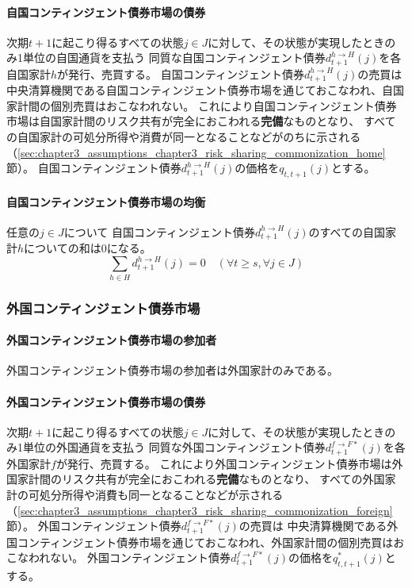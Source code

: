 \paragraph{自国コンティンジェント債券市場の債券}
\label{sec:chapter3_assumptions_bond_markets_home_bonds}
次期\(t+1\)に起こり得るすべての状態\(j\in J\)に対して、その状態が実現したときのみ1単位の自国通貨を支払う
同質な自国コンティンジェント債券\(d_{t+1}^{h\to H}(j)\)を各自国家計\(h\)が発行、売買する。
自国コンティンジェント債券\(d_{t+1}^{h\to H}(j)\)の売買は
中央清算機関である自国コンティンジェント債券市場を通じておこなわれ、自国家計間の個別売買はおこなわれない。
これにより自国コンティンジェント債券市場は自国家計間のリスク共有が完全におこわれる\textbf{完備}なものとなり、
すべての自国家計の可処分所得や消費が同一となることなどがのちに示される
（\ref{sec:chapter3_assumptions_chapter3_risk_sharing_commonization_home}節）。
自国コンティンジェント債券\(d_{t+1}^{h\to H}(j)\)の価格を\(q_{t,t+1}(j)\)とする。

\paragraph{自国コンティンジェント債券市場の均衡}
\label{sec:chapter3_assumptions_bond_markets_home_equilibrium}
任意の\(j\in J\)について
自国コンティンジェント債券\(d_{t+1}^{h\to H}(j)\)のすべての自国家計\(h\)についての和は0になる。
\begin{equation}
\label{form:chapter3_assumptions_bond_markets_home_equilibrium}
    \sum_{h\in H}d_{t+1}^{h\to H}(j)=0 \quad (\forall t\ge s, \forall j\in J)
\end{equation}

\subsubsection{外国コンティンジェント債券市場}
\label{sec:chapter3_assumptions_bond_markets_foreign}

\paragraph{外国コンティンジェント債券市場の参加者}
\label{sec:chapter3_assumptions_bond_markets_foreign_participants}
外国コンティンジェント債券市場の参加者は外国家計のみである。

\paragraph{外国コンティンジェント債券市場の債券}
\label{sec:chapter3_assumptions_bond_markets_foreign_bonds}
次期\(t+1\)に起こり得るすべての状態\(j\in J\)に対して、その状態が実現したときのみ1単位の外国通貨を支払う
同質な外国コンティンジェント債券\(d_{t+1}^{f\to F*}(j)\)を各外国家計\(f\)が発行、売買する。
これにより外国コンティンジェント債券市場は外国家計間のリスク共有が完全におこわれる\textbf{完備}なものとなり、
すべての外国家計の可処分所得や消費も同一となることなどが示される
（\ref{sec:chapter3_assumptions_chapter3_risk_sharing_commonization_foreign}節）。
外国コンティンジェント債券\(d_{t+1}^{f\to F*}(j)\)の売買は
中央清算機関である外国コンティンジェント債券市場を通じておこなわれ、外国家計間の個別売買はおこなわれない。
外国コンティンジェント債券\(d_{t+1}^{f\to F*}(j)\)の価格を\(q_{t,t+1}^*(j)\)とする。


